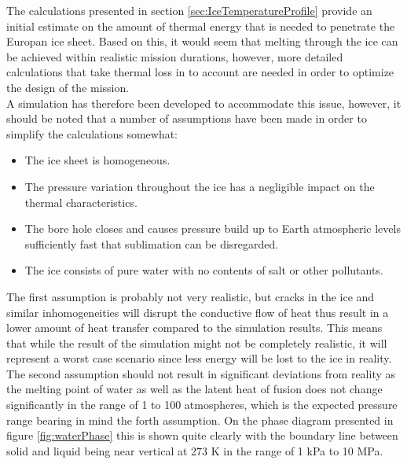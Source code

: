 \label{sec:temp_simulation}

The calculations presented in section \ref{sec:IceTemperatureProfile} provide an initial estimate on the amount of thermal energy that is needed to penetrate the Europan ice sheet. Based on this, it would seem that melting through the ice can be achieved within realistic mission durations, however, more detailed calculations that take thermal loss in to account are needed in order to optimize the design of the mission. \\

\noindent
A simulation has therefore been developed to accommodate this issue, however, it should be noted that a number of assumptions have been made in order to simplify the calculations somewhat:
\begin{itemize}
	\item The ice sheet is homogeneous.
	\item The pressure variation throughout the ice has a negligible impact on the thermal characteristics.
	\item The bore hole closes and causes pressure build up to Earth atmospheric levels sufficiently fast that sublimation can be disregarded.
	\item The ice consists of pure water with no contents of salt or other pollutants.
\end{itemize}
The first assumption is probably not very realistic, but cracks in the ice and similar inhomogeneities will disrupt the conductive flow of heat thus result in a lower amount of heat transfer compared to the simulation results. This means that while the result of the simulation might not be completely realistic, it will represent a worst case scenario since less energy will be lost to the ice in reality. \\

\noindent
The second assumption should not result in significant deviations from reality as the melting point of water as well as the latent heat of fusion does not change significantly in the range of 1 to 100 atmospheres, which is the expected pressure range bearing in mind the forth assumption. On the phase diagram presented in figure \ref{fig:waterPhase} this is shown quite clearly with the boundary line between solid and liquid being near vertical at 273 K in the range of 1 kPa to 10 MPa.\\

